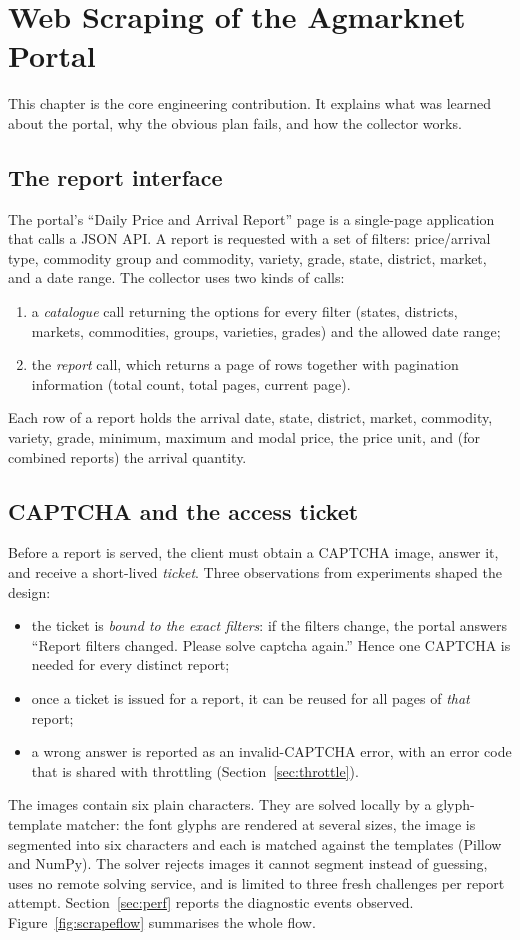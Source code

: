 \documentclass[12pt,a4paper,oneside]{report}
\numberwithin{equation}{chapter}
\numberwithin{figure}{chapter}
\numberwithin{table}{chapter}
\theoremstyle{definition}
\begin{document}
\chapter{Web Scraping of the Agmarknet Portal}

This chapter is the core engineering contribution. It explains what was learned about the portal, why the obvious plan fails, and how the collector works.

\section{The report interface}
The portal's ``Daily Price and Arrival Report'' page is a single-page application that calls a JSON API. A report is requested with a set of filters: price/arrival type, commodity group and commodity, variety, grade, state, district, market, and a date range. The collector uses two kinds of calls:
\begin{enumerate}
  \item a \emph{catalogue} call returning the options for every filter (states, districts, markets, commodities, groups, varieties, grades) and the allowed date range;
  \item the \emph{report} call, which returns a page of rows together with pagination information (total count, total pages, current page).
\end{enumerate}
Each row of a report holds the arrival date, state, district, market, commodity, variety, grade, minimum, maximum and modal price, the price unit, and (for combined reports) the arrival quantity.

\section{CAPTCHA and the access ticket}
Before a report is served, the client must obtain a CAPTCHA image, answer it, and receive a short-lived \emph{ticket}. Three observations from experiments shaped the design:
\begin{itemize}
  \item the ticket is \emph{bound to the exact filters}: if the filters change, the portal answers ``Report filters changed. Please solve captcha again.'' Hence one CAPTCHA is needed for every distinct report;
  \item once a ticket is issued for a report, it can be reused for all pages of \emph{that} report;
  \item a wrong answer is reported as an invalid-CAPTCHA error, with an error code that is shared with throttling (Section~\ref{sec:throttle}).
\end{itemize}
The images contain six plain characters. They are solved locally by a glyph-template matcher: the font glyphs are rendered at several sizes, the image is segmented into six characters and each is matched against the templates (Pillow and NumPy). The solver rejects images it cannot segment instead of guessing, uses no remote solving service, and is limited to three fresh challenges per report attempt. Section~\ref{sec:perf} reports the diagnostic events observed. Figure~\ref{fig:scrapeflow} summarises the whole flow.
\end{document}
